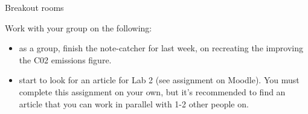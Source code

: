 \documentclass[table]{beamer}\usepackage[]{graphicx}\usepackage[]{color}
\begin{document}
\begin{frame}[fragile]{Breakout rooms}

Work with your group on the following:

\begin{itemize}
  \item as a group, finish the note-catcher for last week, on recreating the improving the C02 emissions figure.
  \item start to look for an article for Lab 2 (see assignment on Moodle). You must complete this assignment on your own, but it's recommended to find an article that you can work in parallel with 1-2 other people on.
\end{itemize}

\end{frame}







\end{document}
